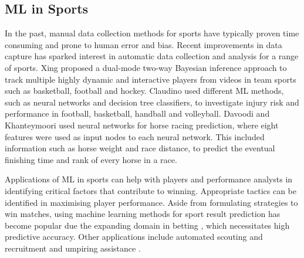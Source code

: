 \subsection{ML in Sports}

In the past, manual data collection methods for sports have typically proven time consuming and prone to human error and bias. Recent improvements in data capture has sparked interest in automatic data collection and analysis for a range of sports. Xing \etal \cite{xing2010multiple} proposed a dual-mode two-way Bayesian inference approach to track multiple highly dynamic and interactive players from videos in team sports such as basketball, football and hockey. Claudino \etal \cite{claudino2019current} used different ML methods, such as neural networks and decision tree classifiers, to investigate injury risk and performance in football, basketball, handball and volleyball. Davoodi and Khanteymoori \cite{davoodi2010horse} used neural networks for horse racing prediction, where eight features were used as input nodes to each neural network. This included information such as horse weight and race distance, to predict the eventual finishing time and rank of every horse in a race. 




Applications of ML in sports can help with players and performance analysts in identifying critical factors that contribute to winning. Appropriate tactics can be identified in maximising player performance.
Aside from formulating strategies to win matches, using machine learning methods for sport result prediction has become popular due the expanding domain in betting \cite{bunker2019machine}, which necessitates high predictive accuracy. Other applications include automated scouting and recruitment \cite{bunker2019machine} and umpiring assistance \cite{vzemgulys2018recognition}. 


